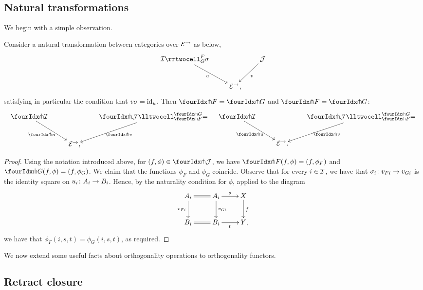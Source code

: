 \documentclass[reqno,10pt,a4paper,oneside,draft]{amsart}
\begin{document}
\subsection*{Natural transformations}

We begin with a simple observation.

\begin{proposition} \label{thm:orth-nat}
Consider a natural transformation between categories over $\catE^\to$ as below,
\[
\xymatrix{
  \cal{I}
  \rrtwocell_G^F{\sigma}
 \ar[dr]_{u}
&&
  \cal{J}
  \ar[dl]^{v}
\\&
  \catE^\to
\rlap{,}}
\]
satisfying in particular the condition that $v \sigma = \id_u$.
Then $\liftr{F} = \liftr{G}$ and $\liftl{F} = \liftl{G}$:
\begin{align*}
\xymatrix{
  \liftr{\cal{I}}
  \ar[dr]_{\liftr{u}}
&&
  \liftr{\cal{J}}
  \lltwocell_{\liftr{F}}^{\liftr{G}}{=}
  \ar[dl]^{\liftr{v}}
\\&
  \catE^\to
\rlap{,}}
&&
\xymatrix{
  \liftl{\cal{I}}
  \ar[dr]_{\liftl{u}}
&&
  \liftl{\cal{J}}
  \lltwocell_{\liftl{F}}^{\liftl{G}}{=}
  \ar[dl]^{\liftl{v}}
\\&
  \catE^\to
\rlap{.}}
\end{align*}
\end{proposition}

\begin{proof} Using the notation introduced above, for $(f, \phi) \in \liftr{\cal{J}}$, we have $\liftr{F}(f, \phi) = (f, \phi_F)$ and $\liftr{G}(f, \phi) = (f, \phi_G)$.
We claim that the functions $\phi_F$ and $\phi_G$ coincide.
Observe that for every $i \in \cal{I}$, we have that $\sigma_i \co v_{Fi} \to v_{Gi}$ is the identity square on $u_i \co A_i \to B_i$.
Hence, by the naturality condition for $\phi$, applied to the diagram
\[
\xymatrix{
  A_i
  \ar@{=}[r]
  \ar[d]_{v_{Fi}}
&
  A_i
  \ar[d]^{v_{Gi}}
  \ar[r]^{s}
&
  X
  \ar[d]^{f}
\\
  B_i
  \ar@{=}[r]
&
  B_i
  \ar[r]_{t}
&
  Y
\rlap{,}}
\]
we have that $\phi_F(i, s, t) = \phi_G(i, s, t)$, as required.
\end{proof}

We now extend some useful facts about orthogonality operations to orthogonality functors.

\subsection*{Retract closure}
\end{document}

